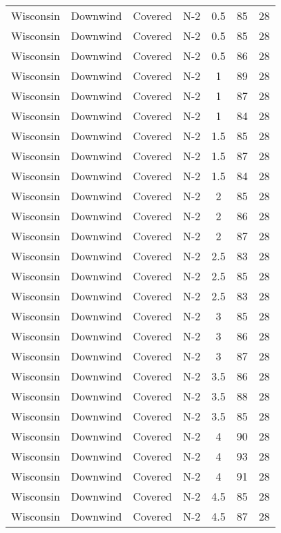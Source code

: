 \documentclass{article}
\begin{document}
\begin{longtable}[H]{ccccccc}
Wisconsin & Downwind & Covered     & N-2 & 0.5  & 85  & 28 \\
Wisconsin & Downwind & Covered     & N-2 & 0.5  & 85  & 28 \\
Wisconsin & Downwind & Covered     & N-2 & 0.5  & 86  & 28 \\
Wisconsin & Downwind & Covered     & N-2 & 1    & 89  & 28 \\
Wisconsin & Downwind & Covered     & N-2 & 1    & 87  & 28 \\
Wisconsin & Downwind & Covered     & N-2 & 1    & 84  & 28 \\
Wisconsin & Downwind & Covered     & N-2 & 1.5  & 85  & 28 \\
Wisconsin & Downwind & Covered     & N-2 & 1.5  & 87  & 28 \\
Wisconsin & Downwind & Covered     & N-2 & 1.5  & 84  & 28 \\
Wisconsin & Downwind & Covered     & N-2 & 2    & 85  & 28 \\
Wisconsin & Downwind & Covered     & N-2 & 2    & 86  & 28 \\
Wisconsin & Downwind & Covered     & N-2 & 2    & 87  & 28 \\
Wisconsin & Downwind & Covered     & N-2 & 2.5  & 83  & 28 \\
Wisconsin & Downwind & Covered     & N-2 & 2.5  & 85  & 28 \\
Wisconsin & Downwind & Covered     & N-2 & 2.5  & 83  & 28 \\
Wisconsin & Downwind & Covered     & N-2 & 3    & 85  & 28 \\
Wisconsin & Downwind & Covered     & N-2 & 3    & 86  & 28 \\
Wisconsin & Downwind & Covered     & N-2 & 3    & 87  & 28 \\
Wisconsin & Downwind & Covered     & N-2 & 3.5  & 86  & 28 \\
Wisconsin & Downwind & Covered     & N-2 & 3.5  & 88  & 28 \\
Wisconsin & Downwind & Covered     & N-2 & 3.5  & 85  & 28 \\
Wisconsin & Downwind & Covered     & N-2 & 4    & 90  & 28 \\
Wisconsin & Downwind & Covered     & N-2 & 4    & 93  & 28 \\
Wisconsin & Downwind & Covered     & N-2 & 4    & 91  & 28 \\
Wisconsin & Downwind & Covered     & N-2 & 4.5  & 85  & 28 \\
Wisconsin & Downwind & Covered     & N-2 & 4.5  & 87  & 28 \\

\end{longtable}
\end{document}
